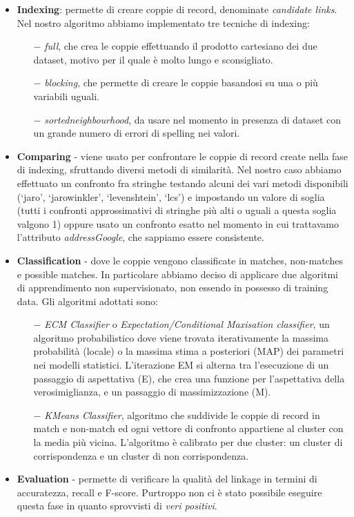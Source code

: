 \documentclass[a4paper,12pt]{article}
\begin{document}
\begin{itemize}
\item \textbf{Indexing}: permette di creare coppie di record, denominate \textit{candidate links}. Nel nostro algoritmo abbiamo implementato tre tecniche di indexing:
\begin{itemize}
	\item[$-$] \textit{full}, che crea le coppie effettuando il prodotto cartesiano dei due dataset, motivo per il quale è molto lungo e sconsigliato.
	\item[$-$] \textit{blocking}, che permette di creare le coppie basandosi su una o più variabili uguali.
	\item[$-$] \textit{sortedneighbourhood}, da usare nel momento in presenza di dataset con un grande numero di errori di spelling nei valori.
\end{itemize}
\item \textbf{Comparing} - viene usato per confrontare le coppie di record create nella fase di indexing, sfruttando diversi metodi di similarità. Nel nostro caso abbiamo effettuato un confronto fra stringhe testando alcuni dei vari metodi disponibili (‘jaro’, ‘jarowinkler’, ‘levenshtein’, ‘lcs’) e impostando un valore di soglia (tutti i confronti approssimativi di stringhe più alti o uguali a questa soglia valgono 1) oppure usato un confronto esatto nel momento in cui trattavamo l'attributo \textit{addressGoogle}, che sappiamo essere consistente.
\item \textbf{Classification} - dove le coppie vengono classificate in matches, non-matches e possible matches. In particolare abbiamo deciso di applicare due algoritmi di apprendimento non supervisionato, non essendo in possesso di training data. Gli algoritmi adottati sono: \\
\begin{itemize}
	\item[$-$] \textit{ECM Classifier} o \textit{Expectation/Conditional Maxisation classifier}, un algoritmo probabilistico dove viene trovata iterativamente la massima probabilità (locale) o la massima stima a posteriori (MAP) dei parametri nei modelli statistici. L'iterazione EM si alterna tra l'esecuzione di un passaggio di aspettativa (E), che crea una funzione per l'aspettativa della verosimiglianza, e un passaggio di massimizzazione (M).
	\item[$-$] \textit{KMeans Classifier}, algoritmo che suddivide le coppie di record in match e non-match ed ogni vettore di confronto appartiene al cluster con la media più vicina. L'algoritmo è calibrato per due cluster: un cluster di corrispondenza e un cluster di non corrispondenza.
\end{itemize}
\item \textbf{Evaluation} - permette di verificare la qualità del linkage in termini di accuratezza, recall e F-score. Purtroppo non ci è stato possibile eseguire questa fase in quanto sprovvisti di \textit{veri positivi}.
\end{itemize}
\end{document}
